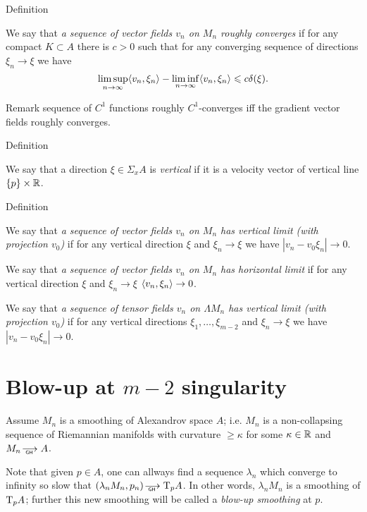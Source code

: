 \documentclass[a4paper,10pt]{article}
\begin{document}
\begin{thm}{Definition}

We say that \emph {a sequence of vector fields $v_n$ on $M_n$ roughly converges }
if for any compact $K\subset A$ there is $c>0$ such that
for any converging sequence of directions $\xi_n\to\xi$
we have
$$\limsup_{n\to\infty} \langle v_n,\xi_n\rangle-
 \liminf_{n\to\infty} \langle v_n,\xi_n\rangle\leqslant
 c\delta(\xi).
 $$
\end{thm}

\begin{thm}{Remark}
sequence of $C^1$ functions roughly $C^1$-converges
iff the gradient vector fields
roughly converges.

\end{thm}


\begin{thm}{Definition}

We say that a direction $\xi\in \Sigma_xA$ is \emph {vertical }
if it is a velocity vector of vertical line $\{p\}\times \mathbb{R}$.
\end{thm}

\begin{thm}{Definition}

We say that \emph {a sequence of vector fields $v_n$ on $M_n$  has vertical limit
(with projection $v_0$) } if for any vertical direction $\xi$ and 
$\xi_n\to\xi$
we have $|v_n-v_0\xi_n|\to 0 $.


We say that \emph {a sequence of vector fields $v_n$ on $M_n$  has horizontal limit}
if for any vertical direction $\xi$ and 
$\xi_n\to\xi$
$\langle v_n,\xi_n\rangle\to 0$.

We say that \emph {a sequence of tensor fields $v_n$ on $\Lambda M_n$  has vertical limit
(with projection $v_0$)} if for any vertical directions $\xi_1,\dots,\xi_{m-2}$ and 
$\xi_n\to\xi$
we have $|v_n-v_0\xi_n|\to 0 $.


\end{thm}




\section{Blow-up at $m-2$ singularity}\label{sec:blow}

Assume $M_n$ is a smoothing of Alexandrov space $A$;
i.e. $M_n$ is a non-collapsing sequence of Riemannian manifolds
with curvature $\ge\kappa$ for some $\kappa\in\mathbb{R}$ and
$M_n\GHto A$.

Note that given $p\in A$,
one can allways find a sequence $\lambda_n$
which converge to infinity so slow that
$(\lambda_n M_n,p_n)\GHto \T_p A$.
In other words, $\lambda_n M_n$ is a smoothing of $\text{\rm T}_pA$;
further this new smoothing will be called a \emph{blow-up smoothing} at $p$.
\end{document}
